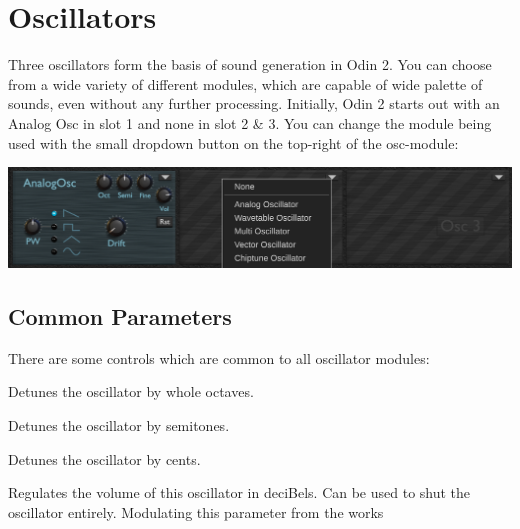\chapter{Oscillators}
Three oscillators form the basis of sound generation in Odin 2. You can choose from a wide variety of different modules, which are capable of wide palette of sounds, even without any further processing. Initially, Odin 2 starts out with an Analog Osc in slot 1 and none in slot 2 \& 3. You can change the module being used with the small dropdown button on the top-right of the osc-module:
\vspace{5mm}

\noindent
\includegraphics[width=\textwidth]{graphics/osc_selection.png}

\section{Common Parameters}
There are some controls which are common to all oscillator modules:

Detunes the oscillator by whole octaves.

Detunes the oscillator by semitones.

Detunes the oscillator by cents.

Regulates the volume of this oscillator in deciBels. Can be used to shut the oscillator entirely. Modulating this parameter from the \modmatrix  works

